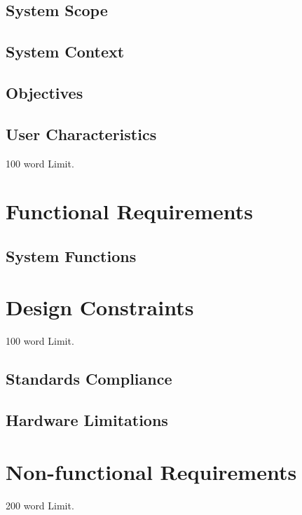 \documentclass[12pt]{article}
\begin{document}
\subsection{System Scope}

\subsection{System Context}

\subsection{Objectives}

\subsection{ User Characteristics}
100 word Limit.


\pagebreak 
\section{Functional Requirements}
\subsection{System Functions}\label{System Functions}

\section{Design Constraints}
100 word Limit.

\subsection{ Standards Compliance}

\subsection{ Hardware Limitations}


\section{Non-functional Requirements}
200 word Limit.

\end{document}
